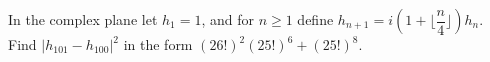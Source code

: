 In the complex plane let $h_1=1$, and for $n\ge1$ define $h_{n+1}=i(1+\lfloor \dfrac{n}{4}\rfloor)h_n$. Find $|h_{101}-h_{100}|^2$ in the form $(26!)^2(25!)^6+(25!)^8$.
